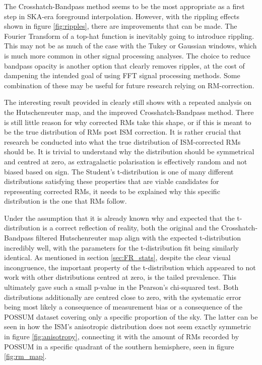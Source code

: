 The Crosshatch-Bandpass method seems to be the most appropriate as a first step in SKA-era foreground interpolation. However, with the rippling effects shown in figure \ref{fig:ripples}, there are improvements that can be made. The Fourier Transform of a top-hat function is inevitably going to introduce rippling. This may not be as much of the case with the Tukey or Gaussian windows, which is much more common in other signal processing analyses. The choice to reduce bandpass opacity is another option that clearly removes ripples, at the cost of dampening the intended goal of using FFT signal processing methods. Some combination of these may be useful for future research relying on RM-correction.


The interesting result provided in \cite{ID73} clearly still shows with a repeated analysis on the Hutschenreuter map, and the improved Crosshatch-Bandpass method. There is still little reason for why corrected RMs take this shape, or if this is meant to be the true distribution of RMs post ISM correction. It is rather crucial that research be conducted into what the true distribution of ISM-corrected RMs should be. It is trivial to understand why the distribution should be symmetrical and centred at zero, as extragalactic polarisation is effectively random and not biased based on sign. The Student's t-distribution is one of many different distributions satisfying these properties that are viable candidates for representing corrected RMs, it needs to be explained why this specific distribution is the one that RMs follow.


Under the assumption that it is already known why and expected that the t-distribution is a correct reflection of reality, both the original and the Crosshatch-Bandpass filtered Hutschenreuter map align with the expected t-distribution incredibly well, with the parameters for the t-distribution fit being similarly identical. As mentioned in section \ref{sec:FR_stats}, despite the clear visual incongruence, the important property of the t-distribution which appeared to not work with other distributions centred at zero, is the tailed prevalence. This ultimately gave such a small p-value in the Pearson's chi-squared test. Both distributions additionally are centred close to zero, with the systematic error being most likely a consequence of measurement bias or a consequence of the POSSUM dataset covering only a specific proportion of the sky. The latter can be seen in how the ISM's anisotropic distribution does not seem exactly symmetric in figure \ref{fig:anisotropy}, connecting it with the amount of RMs recorded by POSSUM in a specific quadrant of the southern hemisphere, seen in figure \ref{fig:rm_map}.


